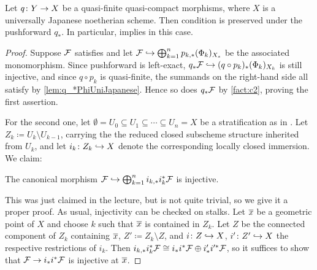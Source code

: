 \begin{lem}\label{lem:c1c2UniJapanese}
	Let $q\colon Y\morphism X$ be a quasi-finite quasi-compact morphisms, where $X$ is a universally Japanese noetherian scheme. Then condition  is preserved under the pushforward $q_*$. In particular,  implies  in this case.
\end{lem}
\begin{proof}
	Suppose $\mathcal{F}$ satisfies  and let $\Ff\monomorphism\bigoplus_{k=1}^np_{k,*}(\Phi_k)_{X_s}$ be the associated monomorphism. Since pushforward is left-exact, $q_*\Ff\monomorphism (q\circ p_k)_*(\Phi_k)_{X_k}$ is still injective, and since $q\circ p_k$ is quasi-finite, the summands on the right-hand side all satisfy  by \cref{lem:q_*PhiUniJapanese}. Hence so does $q_*\mathcal{F}$ by \cref{fact:c2}, proving the first assertion.
	
	For the second one, let $\emptyset=U_0\subseteq U_1\subseteq\dotsb\subseteq U_n=X$ be a stratification as in . Let $Z_k\coloneqq U_k\setminus U_{k-1}$, carrying the the reduced closed subscheme structure inherited from $U_k$, and let $i_k\colon Z_k\monomorphism X$ denote the corresponding locally closed immersion. We claim:
	\begin{alphanumerate}
		\item[\itememph{*}] The canonical morphism $\Ff\monomorphism \bigoplus_{k=1}^ni_{k,*}i_k^*\Ff$ is injective.
	\end{alphanumerate}
	This was just claimed in the lecture, but is not quite trivial, so we give it a proper proof. As usual, injectivity can be checked on stalks. Let $\ov{x}$ be a geometric point of $X$ and choose $k$ such that $\ov{x}$ is contained in $Z_k$. Let $Z$ be the connected component of $Z_k$ containing $\ov{x}$, $Z'\coloneqq Z_k\setminus Z$, and $i\colon Z\monomorphism X$, $i'\colon Z'\monomorphism X$ the respective restrictions of $i_k$. Then $i_{k,*}i_k^*\mathcal{F}\cong i_*i^*\mathcal{F}\oplus i'_*i'^*\mathcal{F}$, so it suffices to show that $\Ff\morphism i_*i^*\Ff$ is injective at $\ov{x}$.
	

\end{proof}
